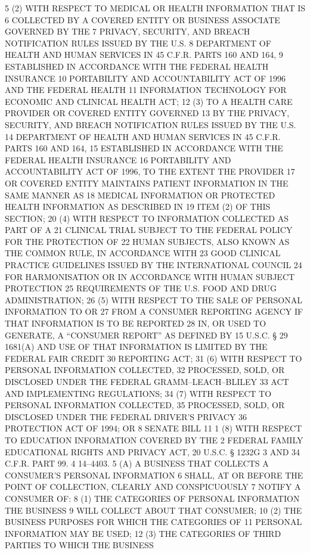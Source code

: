 5 (2) WITH RESPECT TO MEDICAL OR HEALTH INFORMATION THAT IS
6 COLLECTED BY A COVERED ENTITY OR BUSINESS ASSOCIATE GOVERNED BY THE
7 PRIVACY, SECURITY, AND BREACH NOTIFICATION RULES ISSUED BY THE U.S.
8 DEPARTMENT OF HEALTH AND HUMAN SERVICES IN 45 C.F.R. PARTS 160 AND 164,
9 ESTABLISHED IN ACCORDANCE WITH THE FEDERAL HEALTH INSURANCE
10 PORTABILITY AND ACCOUNTABILITY ACT OF 1996 AND THE FEDERAL HEALTH
11 INFORMATION TECHNOLOGY FOR ECONOMIC AND CLINICAL HEALTH ACT;
12 (3) TO A HEALTH CARE PROVIDER OR COVERED ENTITY GOVERNED
13 BY THE PRIVACY, SECURITY, AND BREACH NOTIFICATION RULES ISSUED BY THE U.S.
14 DEPARTMENT OF HEALTH AND HUMAN SERVICES IN 45 C.F.R. PARTS 160 AND 164,
15 ESTABLISHED IN ACCORDANCE WITH THE FEDERAL HEALTH INSURANCE
16 PORTABILITY AND ACCOUNTABILITY ACT OF 1996, TO THE EXTENT THE PROVIDER
17 OR COVERED ENTITY MAINTAINS PATIENT INFORMATION IN THE SAME MANNER AS
18 MEDICAL INFORMATION OR PROTECTED HEALTH INFORMATION AS DESCRIBED IN
19 ITEM (2) OF THIS SECTION;
20 (4) WITH RESPECT TO INFORMATION COLLECTED AS PART OF A
21 CLINICAL TRIAL SUBJECT TO THE FEDERAL POLICY FOR THE PROTECTION OF
22 HUMAN SUBJECTS, ALSO KNOWN AS THE COMMON RULE, IN ACCORDANCE WITH
23 GOOD CLINICAL PRACTICE GUIDELINES ISSUED BY THE INTERNATIONAL COUNCIL
24 FOR HARMONISATION OR IN ACCORDANCE WITH HUMAN SUBJECT PROTECTION
25 REQUIREMENTS OF THE U.S. FOOD AND DRUG ADMINISTRATION;
26 (5) WITH RESPECT TO THE SALE OF PERSONAL INFORMATION TO OR
27 FROM A CONSUMER REPORTING AGENCY IF THAT INFORMATION IS TO BE REPORTED
28 IN, OR USED TO GENERATE, A “CONSUMER REPORT” AS DEFINED BY 15 U.S.C. §
29 1681(A) AND USE OF THAT INFORMATION IS LIMITED BY THE FEDERAL FAIR CREDIT
30 REPORTING ACT;
31 (6) WITH RESPECT TO PERSONAL INFORMATION COLLECTED,
32 PROCESSED, SOLD, OR DISCLOSED UNDER THE FEDERAL GRAMM–LEACH–BLILEY
33 ACT AND IMPLEMENTING REGULATIONS;
34 (7) WITH RESPECT TO PERSONAL INFORMATION COLLECTED,
35 PROCESSED, SOLD, OR DISCLOSED UNDER THE FEDERAL DRIVER’S PRIVACY
36 PROTECTION ACT OF 1994; OR
8 SENATE BILL 11
1 (8) WITH RESPECT TO EDUCATION INFORMATION COVERED BY THE
2 FEDERAL FAMILY EDUCATIONAL RIGHTS AND PRIVACY ACT, 20 U.S.C. § 1232G
3 AND 34 C.F.R. PART 99.
4 14–4403.
5 (A) A BUSINESS THAT COLLECTS A CONSUMER’S PERSONAL INFORMATION
6 SHALL, AT OR BEFORE THE POINT OF COLLECTION, CLEARLY AND CONSPICUOUSLY
7 NOTIFY A CONSUMER OF:
8 (1) THE CATEGORIES OF PERSONAL INFORMATION THE BUSINESS
9 WILL COLLECT ABOUT THAT CONSUMER;
10 (2) THE BUSINESS PURPOSES FOR WHICH THE CATEGORIES OF
11 PERSONAL INFORMATION MAY BE USED;
12 (3) THE CATEGORIES OF THIRD PARTIES TO WHICH THE BUSINESS
